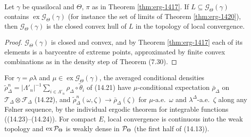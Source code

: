 \begin{corollary}[Georgii (14.25)]
    \label{cor:erg-1425}
    \leanok

    Let $\gamma$ be quasilocal and $\Theta$, $\pi$ as in Theorem \ref{thm:erg-1417}. If
    $L \subseteq \mathcal G_\Theta(\gamma)$ contains $\operatorname{ex}\mathcal G_\Theta(\gamma)$
    (for instance the set of limits of Theorem \ref{thm:erg-1420}), then
    $\mathcal G_\Theta(\gamma)$ is the closed convex hull of $L$ in the topology of local
    convergence.
\end{corollary}
\begin{proof}
    \leanok
    $\mathcal G_\Theta(\gamma)$ is closed and convex, and by Theorem \ref{thm:erg-1417} each of
    its elements is a barycentre of extreme points, approximated by finite convex combinations
    as in the density step of Theorem (7.30).
\end{proof}

\begin{proposition}
    \label{prop:erg-1424}
    \leanok

    For $\gamma = \rho\lambda$ and $\mu \in \operatorname{ex}\mathcal G_\Theta(\gamma)$, the
    averaged conditional densities $\tilde\rho^n_\Delta = |\Lambda'_n|^{-1}\sum_{i \in \Lambda'_n}\rho_\Delta\circ\tilde\theta_i$
    of (14.21) have $\mu$-conditional expectation $\bar\rho_\Delta$ on
    $\mathcal T_\Delta \otimes \mathcal F_\Delta$ (14.22), and
    $\tilde\rho^n_\Delta(\omega,\zeta) \to \bar\rho_\Delta(\zeta)$ for $\mu$-a.e.\ $\omega$ and
    $\lambda^\Delta$-a.e.\ $\zeta$ along any Følner sequence, by the individual ergodic theorem for
    integrable functions ((14.23)--(14.24)). For compact $E$, local convergence is continuous into
    the weak topology and $\operatorname{ex}\mathcal{P}_\Theta$ is weakly dense in $\mathcal{P}_\Theta$ (the
    first half of (14.13)).
\end{proposition}
